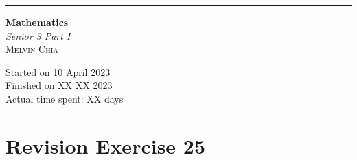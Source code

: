 \documentclass[12pt]{report}
\begin{document}
\newcommand{\sol}[1]{

    \noindent \textbf{Sol.}
}
\newcommand{\prooff}[1]{

    \noindent \textbf{Proof.}
}

\newcommand{\sxrightarrow}[2][]{%
    \mathrel{\text{$\xrightarrow[#1]{#2}$}}%
}

\newenvironment{cequation}{
    \makeatletter
    \setbool{@fleqn}{false}
    \makeatother
    \begin{equation*}
        }{\end{equation*}}

\begin{titlepage}
    \raggedleft{}
    \rule{1pt}{\textheight}
    \hspace{0.02\textwidth}
    \parbox[b]{0.75\textwidth}{

    {\fontsize{40}{60}\selectfont\bfseries Mathematics}\\[2\baselineskip]
    {\huge\textit{Senior 3 Part I}}\\[4\baselineskip]
    {\Large\textsc{Melvin Chia}}

    \vspace{0.5\textheight}

    {\noindent Started on 10 April 2023}\\[\baselineskip]
    {\noindent Finished on XX XX 2023}\\[\baselineskip]
    {\noindent Actual time spent: XX days}\\[\baselineskip]}

\end{titlepage}

\singlespacing{}

\doublespacing{}
\tableofcontents
\singlespacing{}

\newpage

\onehalfspacing

\section{Revision Exercise 25}
\end{document}
